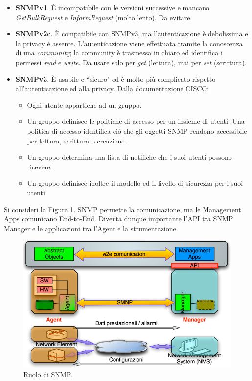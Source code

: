 \begin{itemize}
	\item \textbf{SNMPv1}. È incompatibile con le versioni successive e mancano \textit{GetBulkRequest} e \textit{InformRequest} (molto lento). Da evitare.
	\item \textbf{SNMPv2c}. È compatibile con SNMPv3, ma l'autenticazione è debolissima e la privacy è assente. L'autenticazione viene effettuata tramite la conoscenza di una \textit{community}; la community è trasmessa in chiaro ed identifica i permessi \textit{read} e \textit{write}. Da usare solo per \textit{get} (lettura), mai per \textit{set} (scrittura).
	\item \textbf{SNMPv3}. È usabile e \textquotedblleft sicuro" ed è molto più complicato rispetto all'autenticazione ed alla privacy. Dalla documentazione CISCO:
	\begin{itemize}
		\item Ogni utente appartiene ad un gruppo.
		\item Un gruppo definisce le politiche di accesso per un insieme di utenti. Una politica di accesso identifica ciò che gli oggetti SNMP rendono accessibile per lettura, scrittura o creazione.
		\item Un gruppo determina una lista di notifiche che i suoi utenti possono ricevere.
		\item Un gruppo definisce inoltre il modello ed il livello di sicurezza per i suoi utenti.
	\end{itemize}
\end{itemize}
Si consideri la Figura \ref{img:SNMP-role}. SNMP permette la comunicazione, ma le Management Apps comunicano End-to-End. Diventa dunque importante l'API tra SNMP Manager e le applicazioni tra l'Agent e la strumentazione.
\begin{figure}[htbp]
	\centering
	\includegraphics[scale = 0.55]{images/SNMP-role}
	\caption{Ruolo di SNMP.}
	\label{img:SNMP-role}
\end{figure}\\
